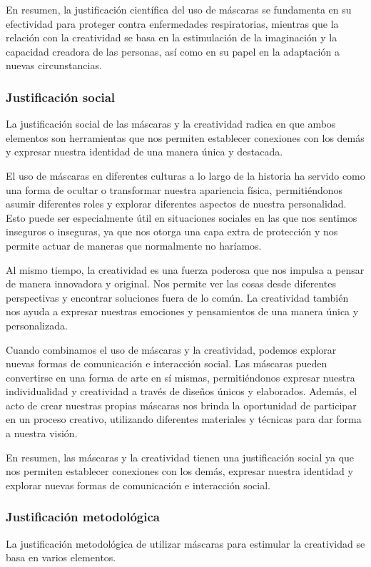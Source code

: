 \documentclass[12pt,a4paper]{article}
\begin{document}
En resumen, la justificación científica del uso de máscaras se fundamenta en su efectividad para proteger contra enfermedades respiratorias, mientras que la relación con la creatividad se basa en la estimulación de la imaginación y la capacidad creadora de las personas, así como en su papel en la adaptación a nuevas circunstancias.

\subsubsection{Justificación social}
La justificación social de las máscaras y la creatividad radica en que ambos elementos son herramientas que nos permiten establecer conexiones con los demás y expresar nuestra identidad de una manera única y destacada.

El uso de máscaras en diferentes culturas a lo largo de la historia ha servido como una forma de ocultar o transformar nuestra apariencia física, permitiéndonos asumir diferentes roles y explorar diferentes aspectos de nuestra personalidad. Esto puede ser especialmente útil en situaciones sociales en las que nos sentimos inseguros o inseguras, ya que nos otorga una capa extra de protección y nos permite actuar de maneras que normalmente no haríamos.

Al mismo tiempo, la creatividad es una fuerza poderosa que nos impulsa a pensar de manera innovadora y original. Nos permite ver las cosas desde diferentes perspectivas y encontrar soluciones fuera de lo común. La creatividad también nos ayuda a expresar nuestras emociones y pensamientos de una manera única y personalizada.

Cuando combinamos el uso de máscaras y la creatividad, podemos explorar nuevas formas de comunicación e interacción social. Las máscaras pueden convertirse en una forma de arte en sí mismas, permitiéndonos expresar nuestra individualidad y creatividad a través de diseños únicos y elaborados. Además, el acto de crear nuestras propias máscaras nos brinda la oportunidad de participar en un proceso creativo, utilizando diferentes materiales y técnicas para dar forma a nuestra visión.

En resumen, las máscaras y la creatividad tienen una justificación social ya que nos permiten establecer conexiones con los demás, expresar nuestra identidad y explorar nuevas formas de comunicación e interacción social.

\subsubsection{Justificación metodológica}
La justificación metodológica de utilizar máscaras para estimular la creatividad se basa en varios elementos.
\end{document}
